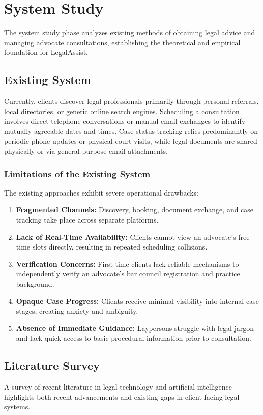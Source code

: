 \chapter{System Study}

The system study phase analyzes existing methods of obtaining legal advice and managing advocate consultations, establishing the theoretical and empirical foundation for LegalAssist.

\section{Existing System}
Currently, clients discover legal professionals primarily through personal referrals, local directories, or generic online search engines. Scheduling a consultation involves direct telephone conversations or manual email exchanges to identify mutually agreeable dates and times. Case status tracking relies predominantly on periodic phone updates or physical court visits, while legal documents are shared physically or via general-purpose email attachments.

\subsection{Limitations of the Existing System}
The existing approaches exhibit severe operational drawbacks:
\begin{enumerate}
    \item \textbf{Fragmented Channels:} Discovery, booking, document exchange, and case tracking take place across separate platforms.
    \item \textbf{Lack of Real-Time Availability:} Clients cannot view an advocate's free time slots directly, resulting in repeated scheduling collisions.
    \item \textbf{Verification Concerns:} First-time clients lack reliable mechanisms to independently verify an advocate's bar council registration and practice background.
    \item \textbf{Opaque Case Progress:} Clients receive minimal visibility into internal case stages, creating anxiety and ambiguity.
    \item \textbf{Absence of Immediate Guidance:} Laypersons struggle with legal jargon and lack quick access to basic procedural information prior to consultation.
\end{enumerate}

\section{Literature Survey}
A survey of recent literature in legal technology and artificial intelligence highlights both recent advancements and existing gaps in client-facing legal systems.

